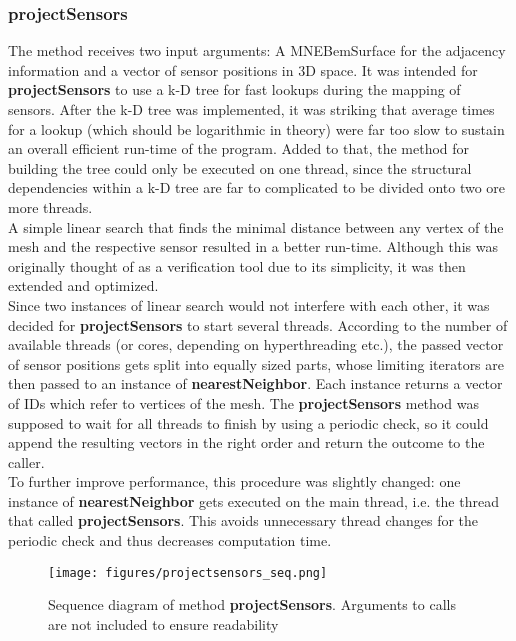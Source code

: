 \subsubsection{projectSensors}
The method  receives two input arguments: A MNEBemSurface for the adjacency information and a vector of sensor positions in 3D space. It was intended for \textbf{projectSensors} to use a k-D tree for fast lookups during the mapping of sensors. After the k-D tree was implemented, it was striking that average times for a lookup (which should be logarithmic in theory) were far too slow to sustain an overall efficient run-time of the program. Added to that, the method for building the tree could only be executed on one thread, since the structural dependencies within a k-D tree are far to complicated to be divided onto two ore more threads.\\
A simple linear search that finds the minimal distance between any vertex of the mesh and the respective sensor resulted in a better run-time. Although this was originally thought of as a verification tool due to its simplicity, it was then extended and optimized.\\
Since two instances of linear search would not interfere with each other, it was decided for \textbf{projectSensors} to start several threads.
According to the number of available threads (or cores, depending on hyperthreading etc.), the passed vector of sensor positions gets split into equally sized parts, whose limiting iterators are then passed to an instance of \textbf{nearestNeighbor}. Each instance returns a vector of IDs which refer to vertices of the mesh. The \textbf{projectSensors} method was supposed to wait for all threads to finish by using a periodic check, so it could append the resulting vectors in the right order and return the outcome to the caller.\\
To further improve performance, this procedure was slightly changed: one instance of \textbf{nearestNeighbor} gets executed on the main thread, i.e. the thread that called \textbf{projectSensors}. This avoids unnecessary thread changes for the periodic check and thus decreases computation time.

\clearpage

\begin{figure}[h]
	\begin{center}
		\texttt{[image: figures/projectsensors\_seq.png]}
		\caption{Sequence diagram of method \textbf{projectSensors}. Arguments to calls are not included to ensure readability}
	\end{center}
\end{figure}


